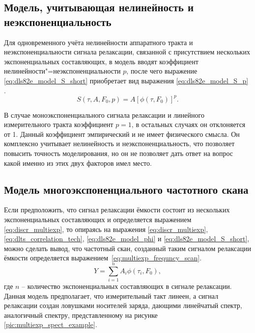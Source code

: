     \subsection{Модель, учитывающая нелинейность и неэкспоненциальность}

    Для одновременного учёта нелинейности аппаратного тракта и 
    неэкспоненциальности сигнала релаксации, связанной с присутствием 
    нескольких экспоненциальных составляющих, в модель вводят коэффициент
    нелинейности"=неэкспоненциальности $p$, после чего выражение 
    \ref{eq:dls82e_model_S_short} приобретает вид выражения 
    \ref{eq:dls82e_model_S_p} \cite{rp_vak}.
    \begin{equation}
        \label{eq:dls82e_model_S_p}
        S(\tau,A,F_0,p) = A\left[\phi(\tau, F_0)\right]^p.
    \end{equation}

    В случае моноэкспоненциального сигнала релаксации и линейного измерительного
    тракта коэффициент $p=1$, в остальных случаях он отклоняется от 1. Данный 
    коэффициент эмпирический и не имеет физического смысла. Он комплексно 
    учитывает нелинейность и неэкспоненциальность, что позволяет повысить 
    точность моделирования, но он не позволяет дать ответ на вопрос какой 
    именно из этих двух факторов имел место.


    \subsection{Модель многоэкспоненциального частотного скана}
    Если предположить, что сигнал релаксации ёмкости состоит из нескольких
    экспоненциальных составляющих и определяется выражением
    \ref{eq:discr_multiexp}, то опираясь на выражения
    \ref{eq:discr_multiexp}, \ref{eq:dlts_correlation_tech},
    \ref{eq:dls82e_model_phi} и \ref{eq:dls82e_model_S_short}, можно
    сделать вывод, что частотный скан, созданный таким сигналом релаксации
    ёмкости определяется выражением~\ref{eq:multiexp_frequncy_scan}.
    \begin{equation}
        \label{eq:multiexp_frequncy_scan}
        Y = \sum_{i=1}^{n} A_i \phi(\tau_i, F_0) ,
    \end{equation}
    где $n$ -- количество экспоненциальных составляющих в сигнале 
    релаксации.
    Данная модель предполагает, что измерительный такт линеен, а сигнал
    релаксации создан ловушками носителей заряда, дающими линейчатый спектр,
    аналогичный спектру, представленному на рисунке 
    \ref{pic:multiexp_spect_example}.